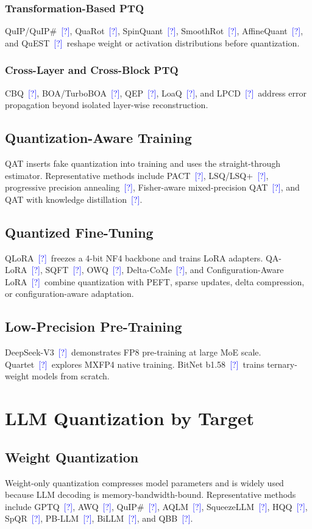 \documentclass[journal,10pt]{IEEEtran}
\newcommand{\CITE}{\textcolor{blue}{[?]}}
\begin{document}
\subsubsection{Transformation-Based PTQ}
QuIP/QuIP\#~\CITE, QuaRot~\CITE, SpinQuant~\CITE, SmoothRot~\CITE, AffineQuant~\CITE, and QuEST~\CITE\ reshape weight or activation distributions before quantization.

\subsubsection{Cross-Layer and Cross-Block PTQ}
CBQ~\CITE, BOA/TurboBOA~\CITE, QEP~\CITE, LoaQ~\CITE, and LPCD~\CITE\ address error propagation beyond isolated layer-wise reconstruction.

\subsection{Quantization-Aware Training}
QAT inserts fake quantization into training and uses the straight-through estimator. Representative methods include PACT~\CITE, LSQ/LSQ+~\CITE, progressive precision annealing~\CITE, Fisher-aware mixed-precision QAT~\CITE, and QAT with knowledge distillation~\CITE.

\subsection{Quantized Fine-Tuning}
QLoRA~\CITE\ freezes a 4-bit NF4 backbone and trains LoRA adapters. QA-LoRA~\CITE, SQFT~\CITE, OWQ~\CITE, Delta-CoMe~\CITE, and Configuration-Aware LoRA~\CITE\ combine quantization with PEFT, sparse updates, delta compression, or configuration-aware adaptation.

\subsection{Low-Precision Pre-Training}
DeepSeek-V3~\CITE\ demonstrates FP8 pre-training at large MoE scale. Quartet~\CITE\ explores MXFP4 native training. BitNet b1.58~\CITE\ trains ternary-weight models from scratch.

\section{LLM Quantization by Target}

\subsection{Weight Quantization}
Weight-only quantization compresses model parameters and is widely used because LLM decoding is memory-bandwidth-bound. Representative methods include GPTQ~\CITE, AWQ~\CITE, QuIP\#~\CITE, AQLM~\CITE, SqueezeLLM~\CITE, HQQ~\CITE, SpQR~\CITE, PB-LLM~\CITE, BiLLM~\CITE, and QBB~\CITE.
\end{document}
